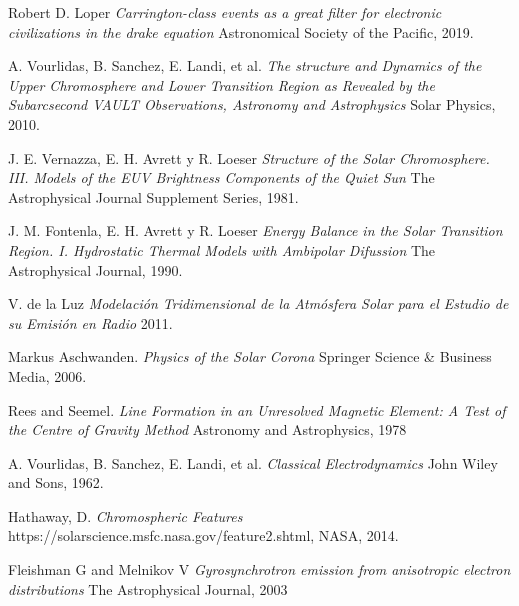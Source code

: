 \documentclass[9pt]{book}
\begin{document}
\begin{thebibliography}{9}

Robert D. Loper
\textit{Carrington-class events as a great filter for electronic civilizations in the drake equation} 
Astronomical Society of the Pacific, 2019.

A. Vourlidas, B. Sanchez, E. Landi, et al.
\textit{The structure and Dynamics of the Upper Chromosphere and Lower Transition Region as Revealed by the Subarcsecond VAULT Observations, Astronomy and Astrophysics} 
Solar Physics, 2010.

J. E. Vernazza, E. H. Avrett y R. Loeser
\textit{Structure of the Solar Chromosphere. III. Models of the EUV Brightness Components of the Quiet Sun} 
The Astrophysical Journal Supplement Series, 1981.

J. M. Fontenla, E. H. Avrett y R. Loeser
\textit{Energy Balance in the Solar Transition Region. I. Hydrostatic Thermal Models with Ambipolar Difussion} 
The Astrophysical Journal, 1990.

V. de la Luz
\textit{Modelaci\'on Tridimensional de la Atm\'osfera Solar para el Estudio de su Emisi\'on en Radio} 
2011.

Markus Aschwanden. 
\textit{Physics of the Solar Corona} 
Springer Science \& Business Media, 2006.

Rees and Seemel.
\textit{Line Formation in an Unresolved Magnetic Element: A Test of the Centre of Gravity Method} 
Astronomy and Astrophysics, 1978

A. Vourlidas, B. Sanchez, E. Landi, et al.
\textit{Classical Electrodynamics} 
John Wiley and Sons, 1962.

Hathaway, D.
\textit{Chromospheric Features} 
https://solarscience.msfc.nasa.gov/feature2.shtml, NASA, 2014.

Fleishman G and Melnikov V
\textit{Gyrosynchrotron emission from anisotropic electron distributions} 
The Astrophysical Journal, 2003

\end{thebibliography}
\end{document}
